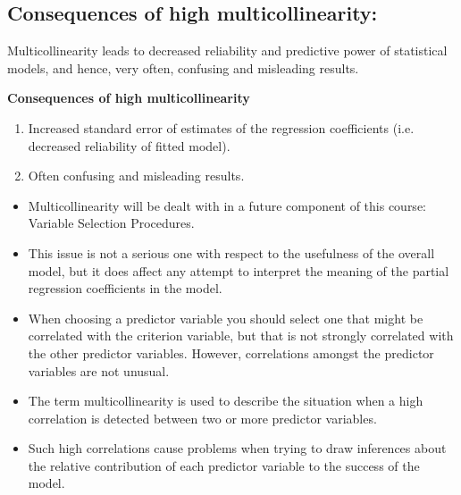 \documentclass[]{report}
\begin{document}
\subsection{Consequences of high multicollinearity:}
Multicollinearity leads to decreased reliability and predictive power of statistical models, and hence, very
often, confusing and misleading results.

\textbf{Consequences of high multicollinearity}\\
\begin{enumerate}
\item Increased standard error of estimates of the regression coefficients (i.e. decreased reliability of fitted
model).
\item Often confusing and misleading results.
\end{enumerate}

\begin{itemize}
\item  Multicollinearity will be dealt with in a future component of this course: Variable Selection Procedures.
\item  This issue is not a serious one with respect to the usefulness of the overall model, but it does affect any attempt to interpret the meaning of the partial regression coefficients in the model.
\item  When choosing a predictor variable you should select one that might be correlated with the criterion
variable, but that is not strongly correlated with the other predictor variables. However, correlations
amongst the predictor variables are not unusual.
\item  The term multicollinearity is used to describe the situation when a high correlation is detected between
two or more predictor variables.
\item  Such high correlations cause problems when trying to draw inferences about the relative contribution of
each predictor variable to the success of the model.
\end{itemize}
\end{document}
